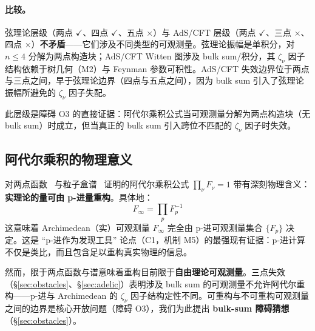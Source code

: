 \documentclass[11pt,a4paper]{ctexart}
\theoremstyle{remark}
\begin{document}
\paragraph{比较。}
弦理论层级（两点 $\checkmark$、四点 $\checkmark$、五点 $\times$）与 AdS/CFT 层级（两点 $\checkmark$、三点 $\times$、四点 $\times$）\textbf{不矛盾}——它们涉及不同类型的可观测量。弦理论振幅是单积分，对 $n \leq 4$ 分解为两点构造块；AdS/CFT Witten 图涉及 bulk sum/积分，其 $\zeta_\nu$ 因子结构依赖于树几何（M2）与 Feynman 参数可积性。AdS/CFT 失效边界位于两点与三点之间，早于弦理论边界（四点与五点之间），因为 bulk sum 引入了弦理论振幅所避免的 $\zeta_\nu$ 因子失配。

此层级是障碍 O3 的直接证据：阿代尔乘积公式当可观测量分解为两点构造块（无 bulk sum）时成立，但当真正的 bulk sum 引入跨位不匹配的 $\zeta_\nu$ 因子时失效。

\subsection{阿代尔乘积的物理意义}

对两点函数~\cite{HSYZ20} 与粒子盒谱~\cite{HMS20} 证明的阿代尔乘积公式 $\prod_\nu F_\nu = 1$ 带有深刻物理含义：\textbf{实理论的量可由 p-进量重构}。具体地：
\begin{equation}
F_\infty = \prod_p F_p^{-1}
\end{equation}
这意味着 Archimedean（实）可观测量 $F_\infty$ 完全由 p-进可观测量集合 $\{F_p\}$ 决定。这是 ``p-进作为发现工具'' 论点（C1，机制 M5）的最强现有证据：p-进计算不仅是类比，而且包含足以重构真实物理的信息。

然而，限于两点函数与谱意味着重构目前限于\textbf{自由理论可观测量}。三点失效（\S\ref{sec:obstacles}、\S\ref{sec:adelic}）表明涉及 bulk sum 的可观测量不允许阿代尔重构——p-进与 Archimedean 的 $\zeta_\nu$ 因子结构定性不同。可重构与不可重构可观测量之间的边界是核心开放问题（障碍 O3），我们为此提出 \textbf{bulk-sum 障碍猜想}（\S\ref{sec:obstacles}）。

\begin{figure}[H]
\centering
{}
\end{figure}
\end{document}
